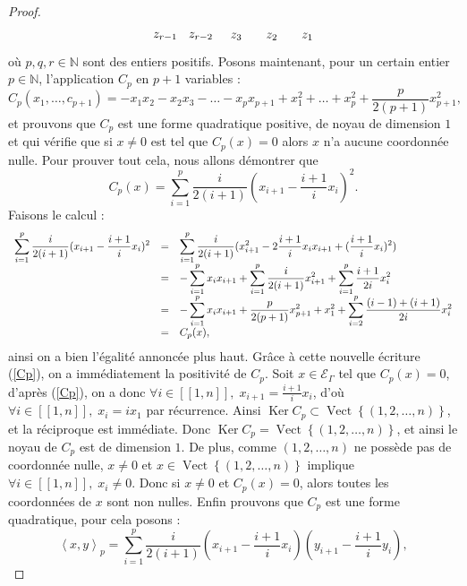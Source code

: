 \documentclass[a4paper,10pt]{article}
\DeclareMathOperator{\Ker}{Ker}
\DeclareMathOperator{\Vect}{Vect}
\newcommand{\ps}[2]{\left\langle#1,#2\right\rangle}
\newcommand{\EG}{\mathscr{E}_\Gamma}
\newcommand{\ent}[2]{[\![#1,#2]\!]}
\newcommand{\dps}{\displaystyle}
\begin{document}
\begin{proof}
\begin{equation}
\begin{tikzpicture}
			\node () at (6,1.3cm) {$z_{r-1}$};
			\node () at (7,1.3cm) {$z_{r-2}$};
			\node () at (8,1.3cm) {$z_{3}$};
			\node () at (9,1.3cm) {$z_{2}$};
			\node () at (10,1.3cm) {$z_{1}$};
	\end{tikzpicture}
	\end{equation}
	où $p,q,r\in\mathbb N$ sont des entiers positifs. Posons maintenant, pour un certain entier $p\in\mathbb N$, l'application $C_p$ en $p+1$ variables :
		\[
			C_p(x_1,\dots,c_{p+1})=-x_1x_2-x_2x_3-\dots-x_px_{p+1}+x_1^2+\dots+x_p^2+\frac{p}{2(p+1)}x_{p+1}^2,
	\]
	et prouvons que $C_p$ est une forme quadratique positive, de noyau de dimension $1$ et qui vérifie que si $x\neq0$ est tel que $C_p(x)=0$ alors $x$ n'a aucune coordonnée nulle. Pour prouver tout cela, nous allons démontrer que 
	\begin{equation}
		C_p(x)=\sum_{i=1}^p\frac{i}{2(i+1)}(x_{i+1}-\frac{i+1}{i}x_i)^2.
		\label{Cp}
	\end{equation}
	Faisons le calcul :
	\[
		\begin{array}{>{\dps}r>{\dps}l>{\dps}l}
	\sum_{i=1}^p\frac{i}{2(i+1)}(x_{i+1}-\frac{i+1}{i}x_i)^2&=& \sum_{i=1}^p\frac{i}{2(i+1)}(x_{i+1}^2-2\frac{i+1}{i}x_ix_{i+1}+(\frac{i+1}{i}x_i)^2)\\
	&=& -\sum_{i=1}^px_ix_{i+1}+\sum_{i=1}^p\frac{i}{2(i+1)}x_{i+1}^2+\sum_{i=1}^p\frac{i+1}{2i}x_i^2\\
	&=& -\sum_{i=1}^px_ix_{i+1}+\frac{p}{2(p+1)}x_{p+1}^2+x_1^2+\sum_{i=2}^p\frac{(i-1)+(i+1)}{2i}x_i^2\\
	&=& C_p(x),\\
\end{array}
	\]
	ainsi on a bien l'égalité annoncée plus haut. Gr\^ace à cette nouvelle écriture (\ref{Cp}), on a immédiatement la positivité de $C_p$. Soit $x\in\EG$ tel que $C_p(x)=0$, d'après (\ref{Cp}), on a donc $\forall i \in\ent{1}{n},\;x_{i+1}=\frac{i+1}{i}x_i$, d'où $\forall i\in\ent{1}{n},\;x_i=ix_1$ par récurrence. Ainsi $\Ker C_p\subset\Vect\left\{ (1,2,\dots,n) \right\}$, et la réciproque est immédiate. Donc $\Ker C_p=\Vect\left\{ (1,2,\dots,n) \right\}$, et ainsi le noyau de $C_p$ est de dimension $1$. De plus, comme $(1,2,\dots,n)$ ne possède pas de coordonnée nulle, $x\neq0$ et $x\in\Vect\left\{ (1,2,\dots,n) \right\}$ implique $\forall i\in\ent{1}{n},\;x_i\neq0$. Donc si $x\neq0$ et $C_p(x)=0$, alors toutes les coordonnées de $x$ sont non nulles. Enfin prouvons que $C_p$ est une forme quadratique, pour cela posons :
	\[
		\ps{x}{y}_p=\sum_{i=1}^p\frac{i}{2(i+1)}(x_{i+1}-\frac{i+1}{i}x_i)(y_{i+1}-\frac{i+1}{i}y_i),
\]
\end{proof}
\end{document}

